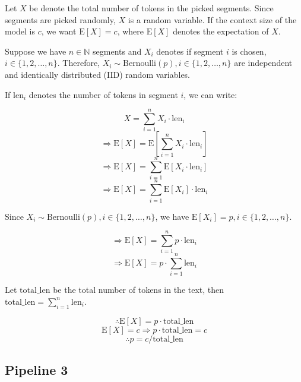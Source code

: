Let $X$ be denote the total number of tokens in the picked segments.
Since segments are picked randomly, $X$ is a random variable.
If the context size of the model is $c$, we want $\mathrm{E}[X] = c$, where $\mathrm{E}[X]$
denotes the expectation of $X$.

Suppose we have $n \in \mathbb{N}$ segments and $X_i$ denotes if segment $i$ is chosen,
$i \in \{1, 2, \dots, n\}$.
Therefore, $X_i \sim \mathrm{Bernoulli}(p), i \in \{1, 2, \dots, n\}$ are independent and
identically distributed (IID) random variables.

If $\mathrm{len}_i$ denotes the number of tokens in segment $i$, we can write:

\[ X = \sum_{i = 1}^{n} X_i \cdot \mathrm{len}_i \]
\[ \Rightarrow \mathrm{E}[X] = \mathrm{E}[\sum_{i = 1}^{n} X_i \cdot \mathrm{len}_i] \]
\[ \Rightarrow \mathrm{E}[X] = \sum_{i = 1}^{n} \mathrm{E}[X_i \cdot \mathrm{len}_i] \]
\[ \Rightarrow \mathrm{E}[X] = \sum_{i = 1}^{n} \mathrm{E}[X_i] \cdot \mathrm{len}_i \]

Since $X_i \sim \mathrm{Bernoulli}(p), i \in \{1, 2, \dots, n\}$, we have
$\mathrm{E}[X_i] = p, i \in \{1, 2, \dots, n\}$.

\[ \Rightarrow \mathrm{E}[X] = \sum_{i = 1}^{n} p \cdot \mathrm{len}_i \]
\[ \Rightarrow \mathrm{E}[X] = p \cdot \sum_{i = 1}^{n} \mathrm{len}_i \]

Let $\mathrm{total\_len}$ be the total number of tokens in the text, then
$\mathrm{total\_len} = \sum_{i = 1}^{n} \mathrm{len}_i$.

\[ \therefore \mathrm{E}[X] = p \cdot \mathrm{total\_len} \]
\[ \mathrm{E}[X] = c \Rightarrow p \cdot \mathrm{total\_len} = c \]
\[ \therefore p = c / \mathrm{total\_len} \]


\subsection*{Pipeline 3}
